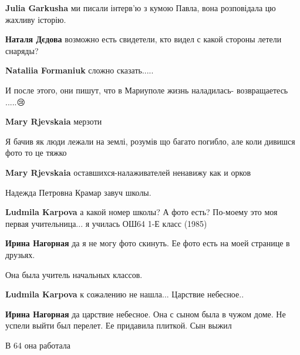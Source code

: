 \begin{multicols}{2}
\begin{itemize}
\begin{itemize}
\textbf{Julia Garkusha} ми писали інтерв'ю з кумою Павла, вона розповідала цю жахливу історію. 🖤

\textbf{Наталя Дєдова} возможно есть свидетели, кто видел с какой стороны летели снаряды?

\textbf{Nataliia Formaniuk} сложно сказать.....
\end{itemize} %


И после этого, они пишут, что в Мариуполе жизнь наладилась- возвращаетесь .....😢

\begin{itemize} %
\textbf{Mary Rjevskaia} мерзоти

Я бачив як люди лежали на землі, розумів що багато погибло, але коли дивишся фото то це тяжко

\textbf{Mary Rjevskaia} оставшихся-налаживателей ненавижу как и орков
\end{itemize} %


Надежда Петровна Крамар завуч школы.

\begin{itemize} %
\textbf{Ludmila Karpova} а какой номер школы? А фото есть? По-моему это моя первая учительница... я училась ОШ64 1-Е класс (1985)

\textbf{Ирина Нагорная} да я не могу фото скинуть. Ее фото есть на моей странице в друзьях.

Она была учитель начальных классов.

\textbf{Ludmila Karpova} к сожалению не нашла... Царствие небесное..

\textbf{Ирина Нагорная} да царствие небесное. Она с сыном была в чужом доме. Не успели выйти был перелет. Ее придавила плиткой. Сын выжил

В 64 она работала
\end{itemize} %

\end{itemize} %

\end{multicols} %
